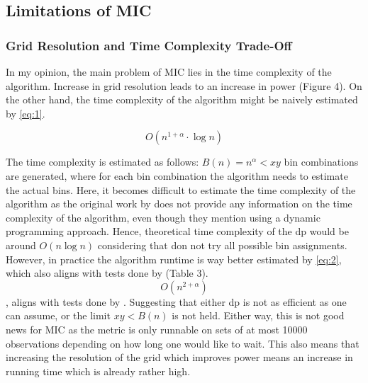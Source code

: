 \documentclass{article}
\begin{document}
\subsection{Limitations of MIC}

\subsubsection{Grid Resolution and Time Complexity Trade-Off}
In my opinion, the main problem of MIC lies in the time complexity of the algorithm. Increase in grid resolution leads to an increase in power \citep{cao2021} (Figure 4). On the other hand, the time complexity of the algorithm might be naively estimated by \autoref{eq:1}.

\begin{equation}
    O(n^{1+\alpha}\cdot \log{n})
    \label{eq:1}
\end{equation}

The time complexity is estimated as follows: $B(n) = n^\alpha < xy$ bin combinations are generated, where for each bin combination the algorithm needs to estimate the actual bins. Here, it becomes difficult to estimate the time complexity of the algorithm as the original work by \cite{reshef2011} does not provide any information on the time complexity of the algorithm, even though they mention using a dynamic programming approach. Hence, theoretical time complexity of the dp would be around $O(n\log{n})$ considering that \cite{reshef2011} don not try all possible bin assignments. However, in practice the algorithm runtime is way better estimated by \autoref{eq:2}, which also aligns with tests done by \cite{cao2021} (Table 3).
\begin{equation}
    O(n^{2+\alpha})
    \label{eq:2}
\end{equation}
, aligns with tests done by \cite{cao2021}. Suggesting that either dp is not as efficient as one can assume, or the limit $xy < B(n)$ is not held. Either way, this is not good news for MIC as the metric is only runnable on sets of at most 10000 observations depending on how long one would like to wait. This also means that increasing the resolution of the grid which improves power \citep{cao2021} means an increase in running time which is already rather high.
\end{document}
